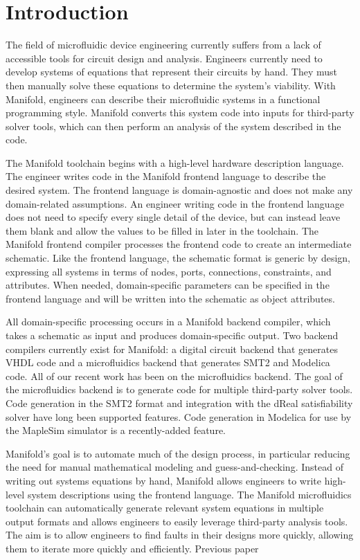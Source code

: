 \section{Introduction}

The field of microfluidic device engineering currently suffers from a lack of accessible tools for circuit design and analysis.
Engineers currently need to develop systems of equations that represent their circuits by hand.
They must then manually solve these equations to determine the system's viability.
With Manifold, engineers can describe their microfluidic systems in a functional programming style.
Manifold converts this system code into inputs for third-party solver tools, which can then perform an analysis of the system described in the code.

The Manifold toolchain begins with a high-level hardware description language.
The engineer writes code in the Manifold frontend language to describe the desired system.
The frontend language is domain-agnostic and does not make any domain-related assumptions.
An engineer writing code in the frontend language does not need to specify every single detail of the device, but can instead leave them blank and allow the values to be filled in later in the toolchain.
The Manifold frontend compiler processes the frontend code to create an intermediate schematic.
Like the frontend language, the schematic format is generic by design, expressing all systems in terms of nodes, ports, connections, constraints, and attributes.
When needed, domain-specific parameters can be specified in the frontend language and will be written into the schematic as object attributes.

All domain-specific processing occurs in a Manifold backend compiler, which takes a schematic as input and produces domain-specific output.
Two backend compilers currently exist for Manifold: a digital circuit backend that generates VHDL code and a microfluidics backend that generates SMT2 and Modelica code.
All of our recent work has been on the microfluidics backend.
The goal of the microfluidics backend is to generate code for multiple third-party solver tools.
Code generation in the SMT2 format and integration with the dReal satisfiability solver have long been supported features.
Code generation in Modelica for use by the MapleSim simulator is a recently-added feature.

Manifold's goal is to automate much of the design process, in particular reducing the need for manual mathematical modeling and guess-and-checking.
Instead of writing out systems equations by hand, Manifold allows engineers to write high-level system descriptions using the frontend language.
The Manifold microfluidics toolchain can automatically generate relevant system equations in multiple output formats and allows engineers to easily leverage third-party analysis tools.
The aim is to allow engineers to find faults in their designs more quickly, allowing them to iterate more quickly and efficiently.
Previous paper \cite{Berzish16cascon}

